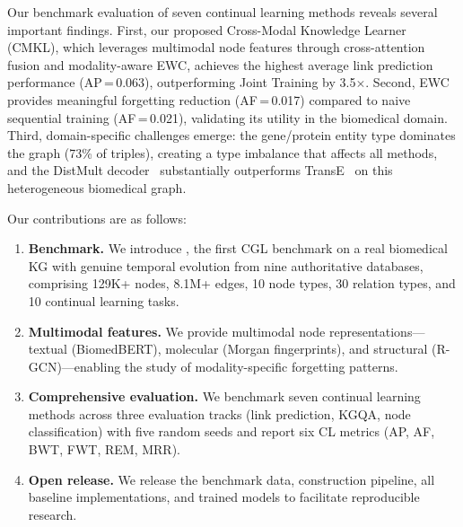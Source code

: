 Our benchmark evaluation of seven continual learning methods reveals several important findings.
First, our proposed Cross-Modal Knowledge Learner (CMKL), which leverages multimodal node features through cross-attention fusion and modality-aware EWC, achieves the highest average link prediction performance (AP\,=\,0.063), outperforming Joint Training by 3.5$\times$.
Second, EWC provides meaningful forgetting reduction (AF\,=\,0.017) compared to naive sequential training (AF\,=\,0.021), validating its utility in the biomedical domain.
Third, domain-specific challenges emerge: the gene/protein entity type dominates the graph (73\% of triples), creating a type imbalance that affects all methods, and the DistMult decoder~\citep{Yang2015} substantially outperforms TransE~\citep{Bordes2013} on this heterogeneous biomedical graph.

\vspace{0.3em}
\noindent Our contributions are as follows:
\begin{enumerate}
    \item \textbf{Benchmark.} We introduce \ours, the first CGL benchmark on a real biomedical KG with genuine temporal evolution from nine authoritative databases, comprising 129K+ nodes, 8.1M+ edges, 10 node types, 30 relation types, and 10 continual learning tasks.
    \item \textbf{Multimodal features.} We provide multimodal node representations---textual (BiomedBERT), molecular (Morgan fingerprints), and structural (R-GCN)---enabling the study of modality-specific forgetting patterns.
    \item \textbf{Comprehensive evaluation.} We benchmark seven continual learning methods across three evaluation tracks (link prediction, KGQA, node classification) with five random seeds and report six CL metrics (AP, AF, BWT, FWT, REM, MRR).
    \item \textbf{Open release.} We release the benchmark data, construction pipeline, all baseline implementations, and trained models to facilitate reproducible research.
\end{enumerate}


